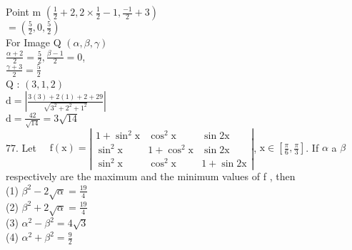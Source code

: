 \documentclass[10pt]{article}
\begin{document}
Point m \(\left(\frac{1}{2}+2,2 \times \frac{1}{2}-1, \frac{-1}{2}+3\right)\)\\
\(=\left(\frac{5}{2}, 0, \frac{5}{2}\right)\)\\
For Image Q \((\alpha, \beta, \gamma)\)\\
\(\frac{\alpha+2}{2}=\frac{5}{2}, \frac{\beta-1}{2}=0\),\\
\(\frac{\gamma+3}{2}=\frac{5}{2}\)\\
Q : \((3,1,2)\)\\
\(\mathrm{d}=\left|\frac{3(3)+2(1)+2+29}{\sqrt{3^{2}+2^{2}+1^{2}}}\right|\)\\
\(\mathrm{d}=\frac{42}{\sqrt{14}}=3 \sqrt{14}\)\\
77. Let \(\quad \mathrm{f}(\mathrm{x})=\left|\begin{array}{ccc}1+\sin ^{2} \mathrm{x} & \cos ^{2} \mathrm{x} & \sin 2 \mathrm{x} \\ \sin ^{2} \mathrm{x} & 1+\cos ^{2} \mathrm{x} & \sin 2 \mathrm{x} \\ \sin ^{2} \mathrm{x} & \cos ^{2} \mathrm{x} & 1+\sin 2 \mathrm{x}\end{array}\right|\), \(\mathrm{x} \in\left[\frac{\pi}{6}, \frac{\pi}{3}\right]\). If \(\alpha\) a \(\beta\) respectively are the maximum and the minimum values of f , then\\
(1) \(\beta^{2}-2 \sqrt{\alpha}=\frac{19}{4}\)\\
(2) \(\beta^{2}+2 \sqrt{\alpha}=\frac{19}{4}\)\\
(3) \(\alpha^{2}-\beta^{2}=4 \sqrt{3}\)\\
(4) \(\alpha^{2}+\beta^{2}=\frac{9}{2}\)
\end{document}
